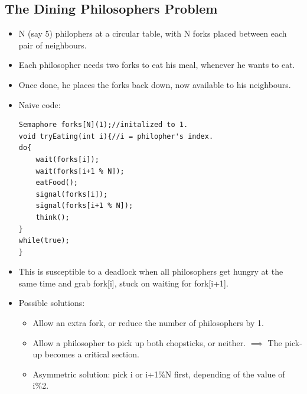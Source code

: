 \documentclass[10pt]{report}
\begin{document}
\subsection{The Dining Philosophers Problem}
\begin{itemize}
\item N (say 5) philophers at a circular table, with N forks placed between each pair of neighbours.
\item Each philosopher needs two forks to eat his meal, whenever he wants to eat.
\item Once done, he places the forks back down, now available to his neighbours.
\item Naive code:
\begin{lstlisting}
Semaphore forks[N](1);//initalized to 1.
void tryEating(int i){//i = philopher's index.
do{
    wait(forks[i]);
    wait(forks[i+1 % N]);
    eatFood();
    signal(forks[i]);
    signal(forks[i+1 % N]);
    think();
}    
while(true);
}
\end{lstlisting}
\item This is susceptible to a deadlock when all philosophers get hungry at the same time and grab fork[i], stuck on waiting for fork[i+1].
\item Possible solutions:
\begin{itemize}
\item Allow an extra fork, or reduce the number of philosophers by 1.
\item Allow a philosopher to pick up both chopsticks, or neither. $\implies$ The pick-up becomes a critical section.
\item Asymmetric solution: pick i or i+1\%N first, depending of the value of i\%2.
\end{itemize}
\end{itemize}
\end{document}
